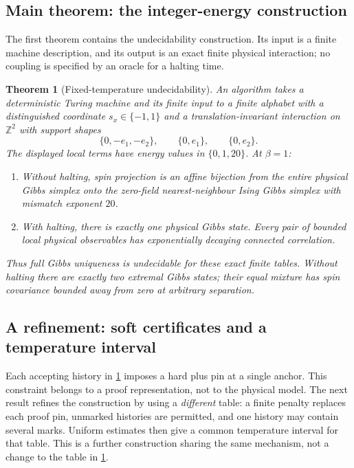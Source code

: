 \documentclass[11pt,reqno]{amsart}
\numberwithin{equation}{section}
\newtheorem{theorem}{Theorem}[section]
\theoremstyle{definition}
\theoremstyle{remark}
\newcommand{\Z}{\mathbb Z}
\begin{document}
\subsection{Main theorem: the integer-energy construction}
The first theorem contains the undecidability construction. Its input is a finite machine description, and its output is an exact finite physical interaction; no coupling is specified by an oracle for a halting time.

\begin{theorem}[Fixed-temperature undecidability]\label{thm:hard}
An algorithm takes a deterministic Turing machine and its finite input to a finite alphabet with a distinguished coordinate $s_x\in\{-1,1\}$ and a translation-invariant interaction on $\Z^2$ with support shapes
\[
 \{0,-e_1,-e_2\},\qquad \{0,e_1\},\qquad \{0,e_2\}.
\]
The displayed local terms have energy values in $\{0,1,20\}$. At $\beta=1$:
\begin{enumerate}
\item Without halting, spin projection is an affine bijection from the entire physical Gibbs simplex onto the zero-field nearest-neighbour Ising Gibbs simplex with mismatch exponent $20$.
\item With halting, there is exactly one physical Gibbs state. Every pair of bounded local physical observables has exponentially decaying connected correlation.
\end{enumerate}
Thus full Gibbs uniqueness is undecidable for these exact finite tables. Without halting there are exactly two extremal Gibbs states; their equal mixture has spin covariance bounded away from zero at arbitrary separation.
\end{theorem}

\subsection{A refinement: soft certificates and a temperature interval}
Each accepting history in \cref{thm:hard} imposes a hard plus pin at a single anchor. This constraint belongs to a proof representation, not to the physical model. The next result refines the construction by using a \emph{different} table: a finite penalty replaces each proof pin, unmarked histories are permitted, and one history may contain several marks. Uniform estimates then give a common temperature interval for that table. This is a further construction sharing the same mechanism, not a change to the table in \cref{thm:hard}.
\end{document}
